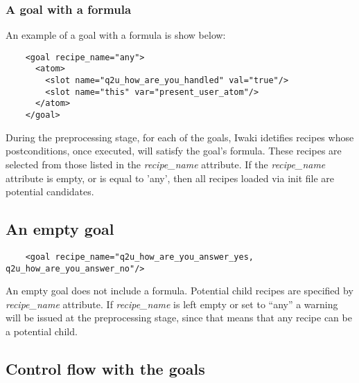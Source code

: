\subsubsection{A goal with a formula}

An example of a goal with a formula is show below:

\lstset{language=XML}
\begin{lstlisting}
    <goal recipe_name="any">
      <atom>
        <slot name="q2u_how_are_you_handled" val="true"/>
        <slot name="this" var="present_user_atom"/>
      </atom>
    </goal>
\end{lstlisting}


During the preprocessing stage, for each of the goals, Iwaki idetifies recipes whose postconditions, once executed, will satisfy the goal's formula.  These recipes are selected from those listed in the \textsl{recipe\_name} attribute. If the \textsl{recipe\_name}  attribute is empty, or is equal to 'any', then all recipes loaded via init file are potential candidates. 
 
\subsection{An empty goal}

\lstset{language=XML}
\begin{lstlisting}
    <goal recipe_name="q2u_how_are_you_answer_yes, q2u_how_are_you_answer_no"/>
\end{lstlisting}

An empty goal does not include a formula. Potential child recipes are specified by \textsl{recipe\_name} attribute. If \textsl{recipe\_name} is left empty or set to ``any'' a warning will be issued at the preprocessing stage, since that means that any recipe can be a potential child.

\subsection{Control flow with the goals}

